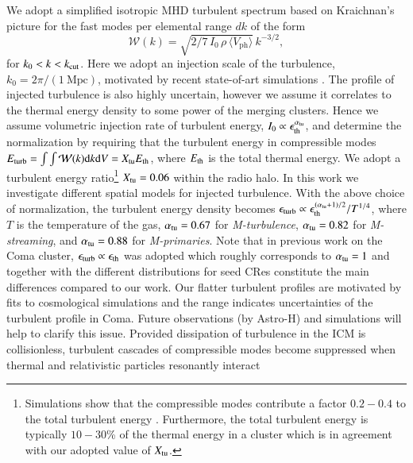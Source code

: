 \documentclass[a4paper,fleqn,usenatbib]{mnras}
\newcommand{\Mstream}{{\it M-streaming}\xspace}
\newcommand{\Mflatturb}{{\it M-turbulence}\xspace}
\newcommand{\Mprimary}{{\it M-primaries}\xspace}
\newcommand{\Vph}{V_\mathrm{ph}}
\begin{document}
We adopt a simplified isotropic MHD turbulent spectrum based on
Kraichnan's picture for the fast modes per elemental range $dk$ of the
form
\begin{equation}
  \label{eq:Wk}
  \mathcal{W}(k) =
\sqrt{2/7\,I_0\,\rho\,\langle \Vph \rangle}\,k^{-3/2},
\end{equation}
for $k_0<k<k_{\mathrm{cut}}$. Here we adopt an injection scale of the
turbulence, $k_0= 2\pi/(1~\mbox{Mpc})$, motivated by recent
state-of-art simulations
\citep{2009A&A...504...33V,2011A&A...529A..17V,2015ApJ...800...60M}.
The profile of injected turbulence is also highly uncertain, however
we assume it correlates to the thermal energy density to some power of
the merging clusters. Hence we assume volumetric injection rate of
turbulent energy, $I_0\propto \epsilon_{\mathrm{th}}^{\alpha_{\mathrm{tu}}}$,
and determine the normalization by requiring that the turbulent energy
in compressible modes $E_{\mathrm{turb}}=\int \int \mathcal{W}(k) {\mathrm{d}}k
{\mathrm{d}}V = X_{\mathrm{tu}} E_{\mathrm{th}}$, where $E_{\mathrm{th}}$ is the total
thermal energy. We adopt a turbulent energy ratio\footnote{Simulations
  show that the compressible modes contribute a factor $0.2-0.4$ to
  the total turbulent energy
  \citep{2013ApJ...771..131B,2015ApJ...800...60M}. Furthermore, the
  total turbulent energy is typically $10-30$\% of the thermal energy
  in a cluster which is in agreement with our adopted value of
  $X_{\mathrm{tu}}$.}  $X_{\mathrm{tu}}=0.06$ within the radio halo. In this
work we investigate different spatial models for injected
turbulence. With the above choice of normalization, the turbulent
energy density becomes $\epsilon_{\mathrm{turb}} \propto
\epsilon_{\mathrm{th}}^{(\alpha_{\mathrm{tu}}+1)/2}/T^{1/4}$, where $T$ is the
temperature of the gas, $\alpha_{\mathrm{tu}}= 0.67$ for \Mflatturb,
$\alpha_{\mathrm{tu}}= 0.82$ for \Mstream, and $\alpha_{\mathrm{tu}}= 0.88$ for
\Mprimary. Note that in previous work on the Coma cluster,
$\epsilon_{\mathrm{turb}} \propto \epsilon_{\mathrm{th}}$ was adopted which
roughly corresponds to $\alpha_{\mathrm{tu}}= 1$ \citep{brunetti12} and
together with the different distributions for seed CRes constitute the
main differences compared to our work. Our flatter turbulent profiles
are motivated by fits to cosmological simulations
\citep{2009ApJ...705.1129L,2010ApJ...725.1452S,2011A&A...529A..17V,2012ApJ...758...74B}
and the range indicates uncertainties of the turbulent profile in
Coma. Future observations (by Astro-H) and simulations will help to
clarify this issue. Provided dissipation of turbulence in the ICM is
collisionless, turbulent cascades of compressible modes become
suppressed when thermal and relativistic particles resonantly interact
\end{document}
